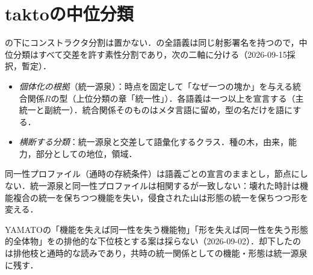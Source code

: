 \documentclass[../../main-detail.tex]{subfiles}
\begin{document}
\section{taktoの中位分類}
の下にコンストラクタ分割は置かない．の全語義は同じ射影署名を持つので，中位分類はすべて交差を許す素性分割であり，次の二軸に分ける（2026-09-15採択，暫定）．
\begin{itemize}
  \item \emph{個体化の根拠}（統一源泉）：時点を固定して「なぜ一つの塊か」を与える統合関係$R$の型（上位分類の章「統一性」）．各語義は一つ以上を宣言する（主統一と副統一）．統合関係そのものはメタ言語に留め，型の名だけを語にする．
  \item \emph{横断する分類}：統一源泉と交差して語彙化するクラス．種の木，由来，能力，部分としての地位，領域．
\end{itemize}
同一性プロファイル（通時の存続条件）は語義ごとの宣言のままとし，節点にしない．統一源泉と同一性プロファイルは相関するが一致しない：壊れた時計は機能複合の統一を保ちつつ機能を失い，侵食された山は形態の統一を保ちつつ形を変える．
\begin{whynot}
YAMATOの「機能を失えば同一性を失う機能物」「形を失えば同一性を失う形態的全体物」をの排他的な下位枝とする案は採らない（2026-09-02）．却下したのは排他枝と通時的な読みであり，共時の統一関係としての機能・形態は統一源泉に残す．
\end{whynot}
\end{document}
